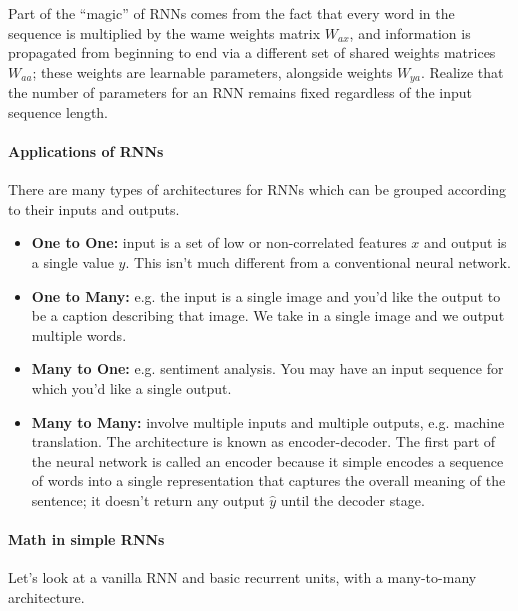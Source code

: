 \documentclass[12pt]{article}
\begin{document}
Part of the ``magic'' of RNNs comes from the fact that every word in the sequence is multiplied by the wame weights matrix $W_{ax}$, and information is propagated from beginning to end via a different set of shared weights matrices $W_{aa}$; these weights are learnable parameters, alongside weights $W_{ya}$. Realize that the number of parameters for an RNN remains fixed regardless of the input sequence length.

\paragraph{Applications of RNNs} There are many types of architectures for RNNs which can be grouped according to their inputs and outputs.

\begin{itemize}
  \item \textbf{One to One:} input is a set of low or non-correlated features $x$ and output is a single value $y$. This isn't much different from a conventional neural network.
\item \textbf{One to Many:} e.g. the input is a single image and you'd like the output to be a caption describing that image. We take in a single image and we output multiple words.
\item \textbf{Many to One:} e.g. sentiment analysis. You may have an input   sequence for which you'd like a single output.
\item \textbf{Many to Many:} involve multiple inputs and multiple outputs, e.g. machine translation. The architecture is known as encoder-decoder. The first part of the neural network is called an encoder because it simple encodes a sequence of words into a single representation that captures the overall meaning of the sentence; it doesn't return any output $\hat y$ until the decoder stage.
\end{itemize}

\paragraph{Math in simple RNNs} Let's look at a vanilla RNN and basic recurrent units, with a many-to-many architecture.
\end{document}
